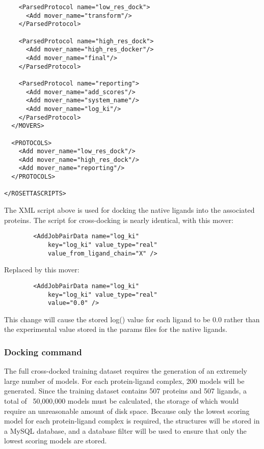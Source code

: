\begin{verbatim}
    <ParsedProtocol name="low_res_dock">
      <Add mover_name="transform"/>
    </ParsedProtocol>
    
    <ParsedProtocol name="high_res_dock">
      <Add mover_name="high_res_docker"/>
      <Add mover_name="final"/>
    </ParsedProtocol>

    <ParsedProtocol name="reporting">
      <Add mover_name="add_scores"/>
      <Add mover_name="system_name"/>
      <Add mover_name="log_ki"/>
    </ParsedProtocol>
  </MOVERS>
  
  <PROTOCOLS>
    <Add mover_name="low_res_dock"/>
    <Add mover_name="high_res_dock"/>
    <Add mover_name="reporting"/>
  </PROTOCOLS>
  
</ROSETTASCRIPTS>
\end{verbatim}
\doublespace
The \ac{XML} script above is used for docking the native ligands into the associated proteins.
The script for cross-docking is nearly identical, with this mover:
\singlespace
\begin{verbatim}
        <AddJobPairData name="log_ki"
            key="log_ki" value_type="real"
            value_from_ligand_chain="X" />
\end{verbatim}
\doublespace
Replaced by this mover:
\singlespace
\begin{verbatim}
        <AddJobPairData name="log_ki"
            key="log_ki" value_type="real"
            value="0.0" />
\end{verbatim}
\doublespace
This change will cause the stored log(\ki) value for each ligand to be 0.0 rather than the experimental value stored in the params files for the native ligands.

\subsubsection{Docking command}
\label{subsubsec:hts_docking_command}
The full cross-docked training dataset requires the generation of an extremely large number of models.
For each protein-ligand complex, 200 models will be generated.
Since the training dataset contains 507 proteins and 507 ligands, a total of ~50,000,000 models must be calculated, the storage of which would require an unreasonable amount of disk space.
Because only the lowest scoring model for each protein-ligand complex is required, the structures will be stored in a MySQL database, and a database filter will be used to ensure that only the lowest scoring models are stored.

